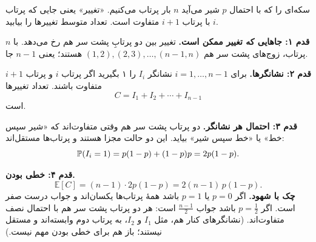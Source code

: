 \begin{exercise}
  سکه‌ای را که با احتمال $p$ شیر می‌آید $n$ بار پرتاب می‌کنیم. «تغییر» یعنی جایی که پرتاب $i$ با پرتاب $i+1$ متفاوت است. تعداد متوسط تغییرها را بیابید.
  \begin{solution}
    \textbf{قدم ۱: جاهایی که تغییر ممکن است.} تغییر بین دو پرتابِ پشت سر هم رخ می‌دهد. با $n$ پرتاب، زوج‌های پشت سر هم $(1,2),(2,3),\dots,(n-1,n)$ هستند؛ یعنی $n-1$ جا.

    \textbf{قدم ۲: نشانگرها.} برای $i=1,\dots,n-1$ نشانگر $I_i$ را ۱ بگیرید اگر پرتاب $i$ و پرتاب $i+1$ متفاوت باشند. تعداد تغییرها
    \[ C=I_1+I_2+\cdots+I_{n-1} \]
    است.

    \textbf{قدم ۳: احتمال هر نشانگر.} دو پرتاب پشت سر هم وقتی متفاوت‌اند که «شیر سپس خط» یا «خط سپس شیر» بیاید. این دو حالت مجزا هستند و پرتاب‌ها مستقل‌اند:
    \[ \P(I_i=1)=p(1-p)+(1-p)p=2p(1-p). \]

    \textbf{قدم ۴: خطی بودن.}
    \[ \mathbb E[C]=(n-1)\cdot2p(1-p)=2(n-1)\,p(1-p). \]
    \textbf{چک با شهود.} اگر $p=0$ یا $p=1$ باشد همهٔ پرتاب‌ها یکسان‌اند و جواب درست صفر است. اگر $p=\frac12$ باشد جواب $\frac{n-1}{2}$ است: هر دو پرتاب پشت سر هم با احتمال نصف متفاوت‌اند. (نشانگرهای کنار هم، مثل $I_1$ و $I_2$، به پرتاب دوم وابسته‌اند و مستقل نیستند؛ باز هم برای خطی بودن مهم نیست.)
  \end{solution}
\end{exercise}

